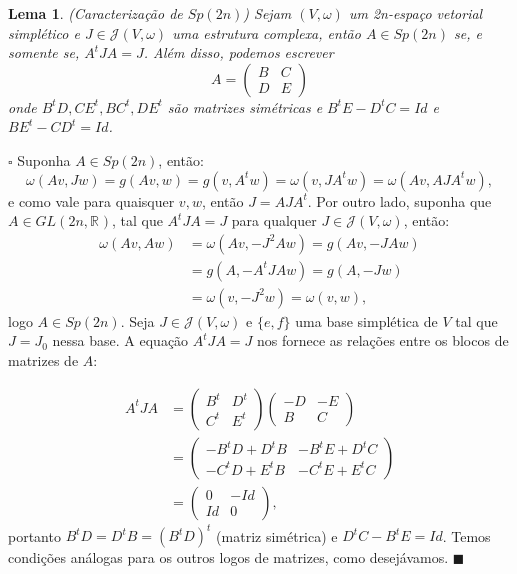 \documentclass[12pt]{book}
\newtheorem{lema}[teorema]{Lema}
\newenvironment{prova}[1]{$\square$ #1}{\hfill$\blacksquare$}
\newcommand{\estruturacomplexapadrao}{\mathcal{J}(V, \omega)}
\newcommand{\generalgroup}[2]{GL(#1, #2)}
\newcommand{\generalgroupreal}[1]{\generalgroup{#1}{\real{}}}
\newcommand{\gruposimpletico}[1]{Sp(#1)}
\newcommand{\real}[1]{\mathbb{R}^{#1}}
\begin{document}
	\begin{lema}\label{lema_caracterizacao_Sp2n}
		(Caracterização de $Sp(2n)$) Sejam $(V, \omega)$ um 2n-espaço vetorial simplético e $J \in \estruturacomplexapadrao$ uma estrutura complexa, então $A\in Sp(2n)$ se, e somente se, $A^{t}JA = J$. Além disso, podemos escrever 
		$$
		A=
		\left(
		\begin{array}{cc}
		B & C
		\\
		D & E
		\end{array}
		\right)
		$$
		onde $B^{t}D, CE^{t}, BC^{t}, DE^{t} $ são matrizes simétricas e $B^{t}E - D^{t}C = Id$ e $BE^{t} - CD^{t} = Id$.
	\end{lema}
	\begin{prova}
		Suponha $A \in Sp(2n)$, então:
		$$
		\omega(Av, Jw)= g(Av,w) = g(v,A^{t}w) = \omega(v, JA^{t}w) = \omega(Av, AJA^{t}w),
		$$
		e como vale para quaisquer $v,w$, então $J = AJA^{t}$. Por outro lado, suponha que $A \in \generalgroupreal{2n}$, tal que $A^{t}JA=J$ para qualquer $J \in \estruturacomplexapadrao$, então:
		$$
		\begin{aligned}
		\omega(Av, Aw) &= \omega(Av, -J^{2}Aw)=g(Av, -JAw) \\
		&= g(A, -A^{t}JAw) = g(A, -Jw) 
		\\
		&= \omega(v, -J^{2}w) = \omega(v, w), 
		\end{aligned}
		$$
		logo $A \in \gruposimpletico{2n}$. Seja $J \in \estruturacomplexapadrao$ e $\{e, f\}$ uma base simplética de $V$ tal que $J = J_{0}$ nessa base. A equação $A^{t}JA=J$ nos fornece as relações entre os blocos de matrizes de $A$:
		
		$$
		\begin{aligned}
			A^{t}JA&=
			\left(
			\begin{array}{cc}
			B^{t} & D^{t}
			\\
			C^{t} & E^{t}
			\end{array}
			\right)
			\left(
			\begin{array}{cc}
			-D & -E
			\\
			B & C
			\end{array}
			\right)
			\\
			&=
			\left(
			\begin{array}{cc}
			-B^{t}D +D^{t}B & -B^{t}E+D^{t}C
			\\
			-C^{t}D+E^{t}B & -C^{t}E+E^{t}C
			\end{array}
			\right)
			\\
			&=	
			\left(
			\begin{array}{cc}
			0 & -Id
			\\
			Id & 0
			\end{array}
			\right),
		\end{aligned}
		$$
		portanto $B^{t}D = D^{t}B = (B^{t}D)^{t}$ (matriz simétrica) e $D^{t}C-B^{t}E = Id$. Temos condições análogas para os outros logos de matrizes, como desejávamos.
	\end{prova}
	
\end{document}
